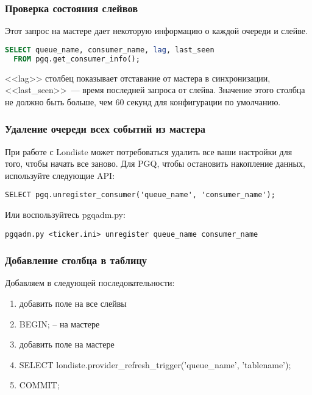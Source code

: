 \subsubsection{Проверка состояния слейвов}
Этот запрос на мастере дает некоторую информацию о каждой очереди и слейве.
\begin{lstlisting}[language=SQL,label=lst:londiste21,caption=Проверка состояния слейвов]
SELECT queue_name, consumer_name, lag, last_seen
  FROM pgq.get_consumer_info();
\end{lstlisting}

<<lag>> столбец показывает отставание от мастера в синхронизации,
<<last\_seen>>~--- время последней запроса от слейва. Значение этого столбца не должно быть больше,
чем 60 секунд для конфигурации по умолчанию.

\subsubsection{Удаление очереди всех событий из мастера}
При работе с Londiste может потребоваться удалить все ваши настройки для того, чтобы начать все заново.
Для PGQ, чтобы остановить накопление данных, используйте следующие API:
\begin{lstlisting}[label=lst:londiste22,caption=Удаление очереди всех событий из мастера]
SELECT pgq.unregister_consumer('queue_name', 'consumer_name');
\end{lstlisting}

Или воспользуйтесь pgqadm.py:
\begin{lstlisting}[label=lst:londiste23,caption=Удаление очереди всех событий из мастера]
pgqadm.py <ticker.ini> unregister queue_name consumer_name
\end{lstlisting}

\subsubsection{Добавление столбца в таблицу}
Добавляем в следующей последовательности:
\begin{enumerate}
 \item добавить поле на все слейвы
 \item BEGIN; -- на мастере
 \item добавить поле на мастере
 \item SELECT londiste.provider\_refresh\_trigger('queue\_name', 'tablename');
 \item COMMIT;
\end{enumerate}

